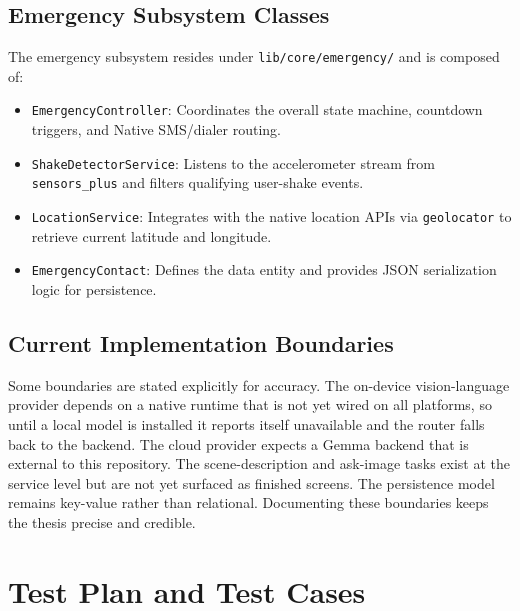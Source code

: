 \documentclass[12pt,a4paper]{report}
\begin{document}
\subsection{Emergency Subsystem Classes}
The emergency subsystem resides under \texttt{lib/core/emergency/} and is composed of:
\begin{itemize}
  \item \texttt{EmergencyController}: Coordinates the overall state machine, countdown triggers, and Native SMS/dialer routing.
  \item \texttt{ShakeDetectorService}: Listens to the accelerometer stream from \texttt{sensors\_plus} and filters qualifying user-shake events.
  \item \texttt{LocationService}: Integrates with the native location APIs via \texttt{geolocator} to retrieve current latitude and longitude.
  \item \texttt{EmergencyContact}: Defines the data entity and provides JSON serialization logic for persistence.
\end{itemize}

\subsection{Current Implementation Boundaries}
Some boundaries are stated explicitly for accuracy. The on-device vision-language provider depends on a native runtime that is not yet wired on all platforms, so until a local model is installed it reports itself unavailable and the router falls back to the backend. The cloud provider expects a Gemma backend that is external to this repository. The scene-description and ask-image tasks exist at the service level but are not yet surfaced as finished screens. The persistence model remains key-value rather than relational. Documenting these boundaries keeps the thesis precise and credible.

\section{Test Plan and Test Cases}
\end{document}
